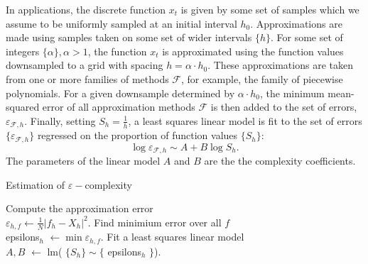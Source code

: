    In applications, the discrete function $x_t$ is given by 
   some set of samples which we assume to be uniformly
   sampled at an initial interval $h_0$.
   Approximations are made using samples taken on some set of wider intervals $\{ h \}$. 
  For some set of integers $\{ \alpha \}, \alpha > 1$, 
  the function $x_t$ is approximated using the function values 
  downsampled to a grid with spacing $h = \alpha \cdot h_0$. 
  These approximations are taken from one or more families of methods $\mathcal{F}$, for example, the family of piecewise polynomials. 
  For a given downsample determined by $\alpha \cdot h_0$, 
   the minimum mean-squared error of all approximation
   methods $\mathcal{F}$ 
   is then added to the set of errors, 
   $\varepsilon_{\mathcal{F}, h}$. 
   Finally, setting $S_h = \frac{1}{h}$, a least squares linear model is fit to the set of errors   $ \{ \varepsilon_{\mathcal{F}, h} \}$ regressed on the proportion of function values 
   $\{ S_h \} $:
  \[
      \log  \varepsilon_{\mathcal{F}, h} 
      \sim A + B \log S_h.
  \]
  The parameters of the linear model $A$ and $B$ are the 
  the complexity coefficients.

   \begin{algorithm}[htb]
    \label{alg:ecomplexity}
  \caption{Estimation of $\varepsilon-$complexity \label{alg:ecomplex}}
  \DontPrintSemicolon
  \SetAlgoLined
  \BlankLine 
  {    
     {
        Compute the approximation error \\ 
        $\varepsilon_{h,f} \leftarrow 
       \frac{1}{N}|f_h - X_{h} |^2$.  \;
    } 
     Find minimium error over all $f$  \\
     epsilons$_h$ $\leftarrow \min \varepsilon_{h,f}$. \;
  }
  Fit a least squares linear model \\
   $A,B$ $\leftarrow$ lm( $\{ S_h \}  \sim \{$ epsilons$_h$ $\}$). \;
  \end{algorithm}

